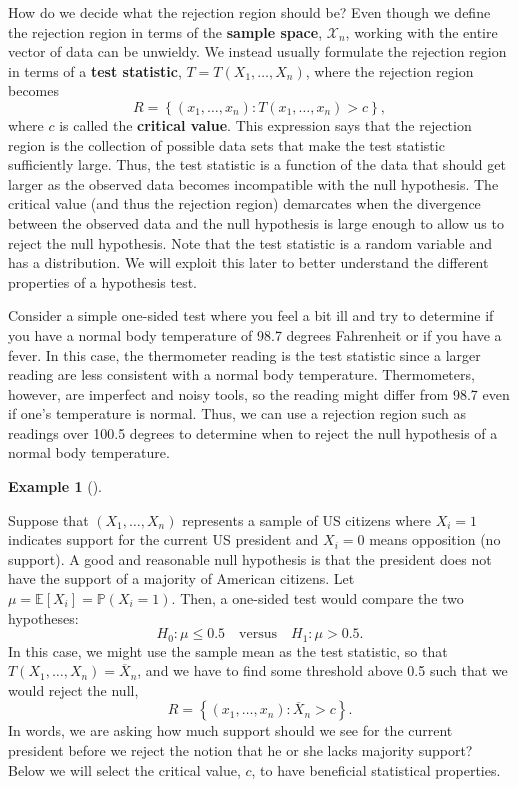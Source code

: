 \documentclass[
  letterpaper,
  DIV=11,
  numbers=noendperiod]{scrreprt}
\newcommand{\E}{\mathbb{E}}
\renewcommand{\P}{\mathbb{P}}
\newcommand{\Xbar}{\overline{X}}
\theoremstyle{definition}
\newtheorem{example}{Example}[chapter]
\theoremstyle{definition}
\theoremstyle{plain}
\theoremstyle{remark}
\begin{document}
How do we decide what the rejection region should be? Even though we
define the rejection region in terms of the \textbf{sample space},
\(\mathcal{X}_n\), working with the entire vector of data can be
unwieldy. We instead usually formulate the rejection region in terms of
a \textbf{test statistic}, \(T = T(X_1, \ldots, X_n)\), where the
rejection region becomes \[
R = \left\{(x_1, \ldots, x_n) : T(x_1, \ldots, x_n) > c\right\},
\] where \(c\) is called the \textbf{critical value}. This expression
says that the rejection region is the collection of possible data sets
that make the test statistic sufficiently large. Thus, the test
statistic is a function of the data that should get larger as the
observed data becomes incompatible with the null hypothesis. The
critical value (and thus the rejection region) demarcates when the
divergence between the observed data and the null hypothesis is large
enough to allow us to reject the null hypothesis. Note that the test
statistic is a random variable and has a distribution. We will exploit
this later to better understand the different properties of a hypothesis
test.

Consider a simple one-sided test where you feel a bit ill and try to
determine if you have a normal body temperature of 98.7 degrees
Fahrenheit or if you have a fever. In this case, the thermometer reading
is the test statistic since a larger reading are less consistent with a
normal body temperature. Thermometers, however, are imperfect and noisy
tools, so the reading might differ from 98.7 even if one's temperature
is normal. Thus, we can use a rejection region such as readings over
100.5 degrees to determine when to reject the null hypothesis of a
normal body temperature.

\begin{example}[]\protect\hypertarget{exm-biden}{}\label{exm-biden}

Suppose that \((X_1, \ldots, X_n)\) represents a sample of US citizens
where \(X_i = 1\) indicates support for the current US president and
\(X_i = 0\) means opposition (no support). A good and reasonable null
hypothesis is that the president does not have the support of a majority
of American citizens. Let \(\mu = \E[X_i] = \P(X_i = 1)\). Then, a
one-sided test would compare the two hypotheses: \[ 
H_0: \mu \leq 0.5 \quad\text{versus}\quad H_1: \mu > 0.5.
\] In this case, we might use the sample mean as the test statistic, so
that \(T(X_1, \ldots, X_n) = \Xbar_n\), and we have to find some
threshold above 0.5 such that we would reject the null, \[ 
R = \left\{(x_1, \ldots, x_n): \Xbar_n > c\right\}.
\] In words, we are asking how much support should we see for the
current president before we reject the notion that he or she lacks
majority support? Below we will select the critical value, \(c\), to
have beneficial statistical properties.

\end{example}
\end{document}
